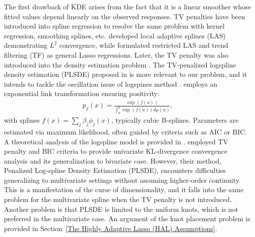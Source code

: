 The first drawback of KDE arises from the fact that it is a linear smoother whose fitted values depend linearly on the observed responses. TV penalties have been introduced
into spline regression to resolve the same problem with kernel regression, smoothing splines, etc.    \citet{mammen1997locally} developed local adaptive splines (LAS) demonstrating $L^2$ convergence, while \citet{tibshirani2014adaptive} formulated restricted LAS and trend filtering (TF) as general Lasso regressions. Later, the TV penalty was also introduced into the density estimation problem \citep{bak2021penalized, sadhanala2024exponential}. The TV-penalized logspline density estimation (PLSDE) proposed in \citet{bak2021penalized} is more relevant to our problem, and it intends to tackle the oscillation issue of logspines method \citep{kooperberg1991study, kooperberg1992logspline}. \citet{kooperberg1992logspline} employs an exponential link transformation ensuring positivity:
\begin{align}
\label{Link_function}
p_{f}(x) = \frac{\exp(f(x))}{\int_a^b \exp(f(u)) d\mu(u)},
\end{align}
with splines $f(x) = \sum_j \beta_j \phi_j(x)$, typically cubic B-splines. Parameters are estimated via maximum likelihood, often guided by criteria such as AIC or BIC. A theoretical analysis of the logspline model is provided in \citet{stone1990large}.
\citet{bak2021penalized} employed TV penalty and BIC criteria to provide univariate KL-divergence convergence analysis and its generalization to bivariate case. However, their method, Penalized Log-spline Density Estimation (PLSDE), encounters difficulties generalizing to multivariate settings without assuming higher-order continuity. This is a manifestation of the curse of dimensionality, and it falls into the same problem for the multivariate spline when the TV penalty is not introduced. Another problem is that PLSDE is limited to the uniform knots, which is not preferred in the multivariate case. An argument of the knot placement problem is provided in Section~\ref{The Highly Adaptive Lasso (HAL) Assumptions}.

